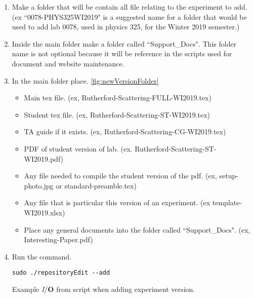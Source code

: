 \documentclass[justified]{book}
\begin{document}
\begin{enumerate}
\item Make a folder that will be contain all file relating to the experiment to add. (ex ``0078-PHYS325WI2019" is a suggested name for a folder that would be used to add lab 0078, used in physics 325, for the Winter 2019 semester.)
\item Inside the main folder make a folder called ``Support\_Docs". This folder name is not optional because it will be reference in the scripts used for document and website maintenance. 
\item In the main folder place. \ref{fig:newVersionFolder}
\begin{itemize}
\item Main tex file. (ex, Rutherford-Scattering-FULL-WI2019.tex)
\item Student tex file. (ex, Rutherford-Scattering-ST-WI2019.tex)
\item TA guide if it exists. (ex, Rutherford-Scattering-CG-WI2019.tex)
\item PDF of student version of lab. (ex. Rutherford-Scattering-ST-WI2019.pdf)
\item Any file needed to compile the student version of the pdf. (ex, setup-photo.jpg or standard-preamble.tex)
\item Any file that is particular this version of an experiment. (ex template-WI2019.xlsx)
\item Place any general documents into the folder called ``Support\_Docs". (ex, Interesting-Paper.pdf)
\end{itemize}

\item Run the command. \label{step:addLab}
\begin{lstlisting}[backgroundcolor = \color{light-gray}]
sudo ./repositoryEdit --add
\end{lstlisting}

Example {\it I}/{\bf O} from script when adding experiment version.


\end{enumerate}
\end{document}
